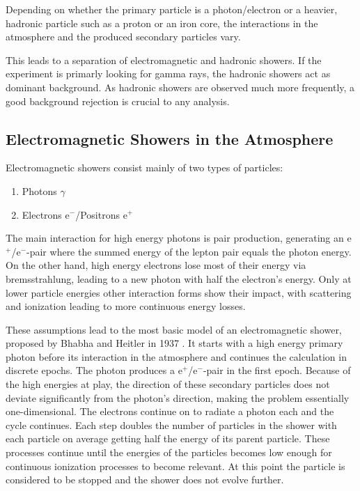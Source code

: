 Depending on whether the primary particle is 
a photon/electron or a heavier, hadronic particle such as a proton 
or an iron core, the interactions in the atmosphere and the 
produced secondary particles vary.

This leads to a separation of electromagnetic and hadronic showers.
If the experiment is primarly looking for gamma rays,
the hadronic showers act as dominant background.
As hadronic showers are observed much more frequently, 
a good background rejection is crucial to any analysis.

\subsection{Electromagnetic Showers in the Atmosphere}
Electromagnetic showers consist mainly of two types of particles:
\begin{enumerate}
	\item{Photons $\gamma$}
	\item{Electrons e$^-$/Positrons e$^+$}
\end{enumerate}

The main interaction for high energy photons is pair 
production, generating an e$^+$/e$^-$-pair where the summed energy of 
the lepton pair equals the photon energy.
On the other hand, high energy electrons lose 
most of their energy via bremsstrahlung, leading to a new photon
with half the electron's energy.
Only at lower particle energies other interaction forms show their impact,
with scattering and ionization 
leading to more continuous energy losses.

These assumptions lead to the most basic model of an 
electromagnetic shower, proposed by Bhabha and Heitler in 1937
\cite{doi:10.1098/rspa.1937.0082}.
It starts with a high energy primary photon before its interaction in the atmosphere 
and continues the calculation in discrete epochs.
The photon produces a e$^+$/e$^-$-pair in the first epoch.
Because of the high energies at play, the direction of these secondary 
particles does not deviate significantly from the photon's direction, 
making the problem essentially one-dimensional.
The electrons continue on to radiate a photon each and the cycle continues.
Each step doubles the number of particles in the shower with each particle 
on average getting half the energy of its parent particle.
These processes continue until the energies of the particles becomes low enough for
continuous ionization processes to become relevant.
At this point the particle is considered to be stopped and the shower
does not evolve further.

